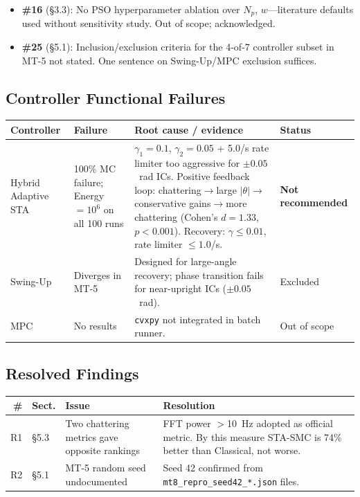 \documentclass[10pt, a4paper]{article}
\begin{document}
\begin{itemize}[leftmargin=1.5em,itemsep=0.3em]
  \item \textbf{\#16} (\S3.3): No PSO hyperparameter ablation over $N_p$, $w$---literature
  defaults used without sensitivity study.  Out of scope; acknowledged.
  \item \textbf{\#25} (\S5.1): Inclusion/exclusion criteria for the 4-of-7 controller
  subset in MT-5 not stated.  One sentence on Swing-Up/MPC exclusion suffices.
\end{itemize}

\subsection*{Controller Functional Failures}

\begin{center}
\small
\begin{tabularx}{\columnwidth}{@{}p{1.65cm}p{1.75cm}Xp{1.5cm}@{}}
\toprule
\textbf{Controller} & \textbf{Failure} & \textbf{Root cause / evidence} & \textbf{Status} \\
\midrule
Hybrid Adaptive STA &
  100\% MC failure; Energy$=10^6$ on all 100 runs &
  $\gamma_1{=}0.1$, $\gamma_2{=}0.05$ + 5.0/s rate limiter too aggressive
  for ${\pm}0.05$~rad ICs.  Positive feedback loop: chattering$\to$large
  $|\theta|\to$conservative gains$\to$more chattering
  (Cohen's $d{=}1.33$, $p{<}0.001$).  Recovery: $\gamma{\le}0.01$,
  rate limiter ${\le}1.0$/s. &
  \textcolor{blocked}{\textbf{Not recommended}} \\
\addlinespace
Swing-Up &
  Diverges in MT-5 &
  Designed for large-angle recovery; phase transition fails for
  near-upright ICs (${\pm}0.05$~rad). &
  Excluded \\
\addlinespace
MPC &
  No results &
  \texttt{cvxpy} not integrated in batch runner. &
  Out of scope \\
\bottomrule
\end{tabularx}
\end{center}

\subsection*{\textcolor{done}{Resolved Findings}}

\begin{center}
\small
\begin{tabularx}{\columnwidth}{@{}rp{0.85cm}p{2.8cm}X@{}}
\toprule
\textbf{\#} & \textbf{Sect.} & \textbf{Issue} & \textbf{Resolution} \\
\midrule
R1 & \S5.3 & Two chattering metrics gave opposite rankings &
  FFT power $>$10~Hz adopted as official metric.  By this measure
  STA-SMC is 74\% better than Classical, not worse. \\
R2 & \S5.1 & MT-5 random seed undocumented &
  Seed 42 confirmed from \texttt{mt8\_repro\_seed42\_*.json} files. \\
\bottomrule
\end{tabularx}
\end{center}
\end{document}
